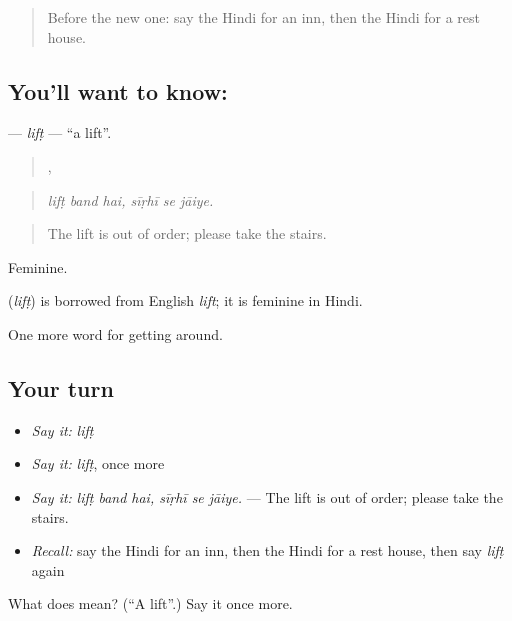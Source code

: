 \label{lesson:HI-C413-lift}



\begin{quote}
Before the new one: say the Hindi for an inn, then the Hindi for a rest house.
\end{quote}

\subsection*{You'll want to know: }
\textbf{} — \emph{lifṭ} — \textquotedblleft{}a lift\textquotedblright{}.

\begin{quote}
  ,   
\end{quote}

\begin{quote}
\emph{lifṭ band hai, sīṛhī se jāiye.}
\end{quote}

\begin{quote}
The lift is out of order; please take the stairs.
\end{quote}

Feminine.

\begin{cousinweb}
\textbf{} (\emph{lifṭ}) is borrowed from English \emph{lift}; it is feminine in Hindi.
\end{cousinweb}

\begin{grammarlens}[title={What you've built}]
One more word for getting around.
\end{grammarlens}

\subsection*{Your turn}
\begin{itemize}
\raggedright
  \item \emph{Say it:} \emph{lifṭ}
  \item \emph{Say it:} \emph{lifṭ}, once more
  \item \emph{Say it:} \emph{lifṭ band hai, sīṛhī se jāiye.} — The lift is out of order; please take the stairs.
  \item \emph{Recall:} say the Hindi for an inn, then the Hindi for a rest house, then say \emph{lifṭ} again
\end{itemize}

\begin{tcolorbox}[breakable,colback=teal!4,colframe=teal!35!black,title={Before you move on}]
What does  mean? (\textquotedblleft{}A lift\textquotedblright{}.) Say it once more.
\end{tcolorbox}
